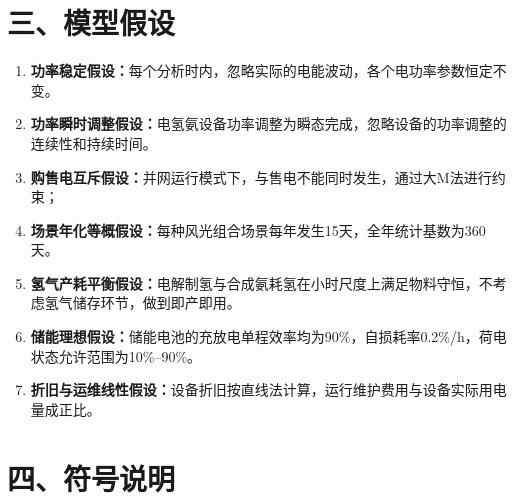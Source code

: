 \documentclass[zihao=-4,a4paper]{ctexart} %
\begin{document}
	\section*{三、模型假设}
	\begin{enumerate}
		\item \textbf{功率稳定假设：}每个分析时内，忽略实际的电能波动，各个电功率参数恒定不变。
		\item \textbf{功率瞬时调整假设：}电氢氨设备功率调整为瞬态完成，忽略设备的功率调整的连续性和持续时间。
		\item \textbf{购售电互斥假设：}并网运行模式下，与售电不能同时发生，通过大M法进行约束；
		\item \textbf{场景年化等概假设：}每种风光组合场景每年发生15天，全年统计基数为360天。
		\item \textbf{氢气产耗平衡假设：}电解制氢与合成氨耗氢在小时尺度上满足物料守恒，不考虑氢气储存环节，做到即产即用。
		\item \textbf{储能理想假设：}储能电池的充放电单程效率均为90\%，自损耗率0.2\%/h，荷电状态允许范围为10\%--90\%。
		\item \textbf{折旧与运维线性假设：}设备折旧按直线法计算，运行维护费用与设备实际用电量成正比。
	\end{enumerate}
	
	\newpage
	\section*{四、符号说明}
	
\end{document}
